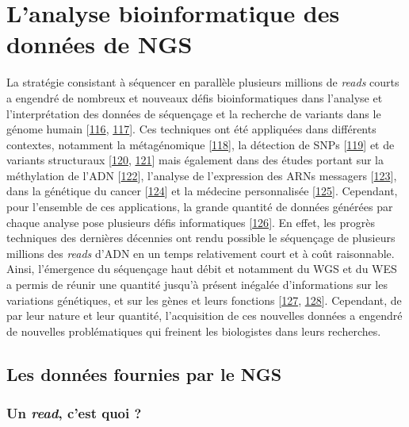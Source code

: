 \documentclass[12pt,a4paper,twoside]{ugathesis}
\theoremstyle{definition}
\theoremstyle{definition}
\theoremstyle{definition}
\theoremstyle{remark}
\begin{document}
\newpage  

\section{L'analyse bioinformatique des données de
NGS}\label{lanalyse-bioinformatique-des-donnees-de-ngs}

La stratégie consistant à séquencer en parallèle plusieurs millions de
\emph{reads} courts a engendré de nombreux et nouveaux défis
bioinformatiques dans l'analyse et l'interprétation des données de
séquençage et la recherche de variants dans le génome humain
{[}\protect\hyperlink{ref-Wold2007}{116},
\protect\hyperlink{ref-Yang2009}{117}{]}. Ces techniques ont été
appliquées dans différents contextes, notamment la métagénomique
{[}\protect\hyperlink{ref-Qin2010}{118}{]}, la détection de SNPs
{[}\protect\hyperlink{ref-VanTassell2008}{119}{]} et de variants
structuraux {[}\protect\hyperlink{ref-Alkan2010}{120},
\protect\hyperlink{ref-Medvedev2009}{121}{]} mais également dans des
études portant sur la méthylation de l'ADN
{[}\protect\hyperlink{ref-Taylor2007}{122}{]}, l'analyse de l'expression
des ARNs messagers {[}\protect\hyperlink{ref-Sultan2008}{123}{]}, dans
la génétique du cancer {[}\protect\hyperlink{ref-Guffanti2009}{124}{]}
et la médecine personnalisée
{[}\protect\hyperlink{ref-Auffray2009}{125}{]}. Cependant, pour
l'ensemble de ces applications, la grande quantité de données générées
par chaque analyse pose plusieurs défis informatiques
{[}\protect\hyperlink{ref-Horner2009}{126}{]}. En effet, les progrès
techniques des dernières décennies ont rendu possible le séquençage de
plusieurs millions des \emph{reads} d'ADN en un temps relativement court
et à coût raisonnable. Ainsi, l'émergence du séquençage haut débit et
notamment du WGS et du WES a permis de réunir une quantité jusqu'à
présent inégalée d'informations sur les variations génétiques, et sur
les gènes et leurs fonctions {[}\protect\hyperlink{ref-Mardis2008}{127},
\protect\hyperlink{ref-Bentley2006}{128}{]}. Cependant, de par leur
nature et leur quantité, l'acquisition de ces nouvelles données a
engendré de nouvelles problématiques qui freinent les biologistes dans
leurs recherches.

\subsection{Les données fournies par le
NGS}\label{les-donnees-fournies-par-le-ngs}

\subsubsection{\texorpdfstring{Un \emph{read}, c'est quoi
?}{Un read, c'est quoi ?}}\label{un-read-cest-quoi}
\end{document}
